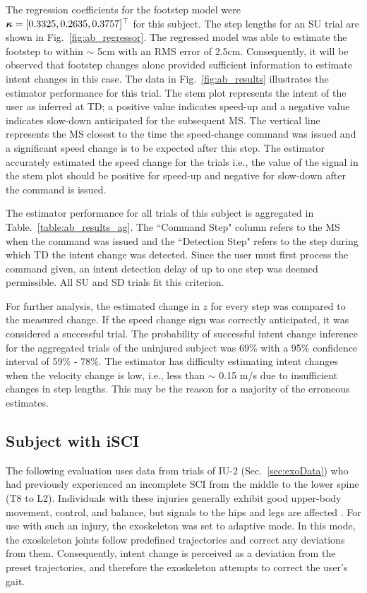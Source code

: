 The regression coefficients for the footstep model were $ \boldsymbol{\kappa} = [0.3325 ,0.2635 ,0.3757]^{\top} $ for this subject. The step lengths for an SU trial are shown in Fig.~\ref{fig:ab_regressor}. The regressed model was able to estimate the footstep to within $ \sim $ 5cm with an RMS error of 2.5cm. Consequently, it will be observed that footstep changes alone provided sufficient information to estimate intent changes in this case. The data in Fig.~\ref{fig:ab_results} illustrates the estimator performance for this trial. The stem plot represents the intent of the user as inferred at TD; a positive value indicates speed-up and a negative value indicates slow-down anticipated for the subsequent MS. The vertical line represents the MS closest to the time the speed-change command was issued and a significant speed change is to be expected after this step. The estimator accurately estimated the speed change for the trials i.e., the value of the signal in the stem plot should be positive for speed-up and negative for slow-down after the command is issued.

The estimator performance for all trials of this subject is aggregated in Table.~\ref{table:ab_results_ag}. The ``Command Step" column refers to the MS when the command was issued and the ``Detection Step" refers to the step during which TD the intent change was detected. Since the user must first process the command given, an intent detection delay of up to one step was deemed permissible. All SU and SD trials fit this criterion. 
		
For further analysis, the estimated change in $ z $ for every step was compared to the measured change. If the speed change sign was correctly anticipated, it was considered a successful trial. The probability of successful intent change inference for the aggregated trials of the uninjured subject was 69\% with a 95\% confidence interval \cite{brown2001interval} of 59\% - 78\%. The estimator has difficulty estimating intent changes when the velocity change is low, i.e., less than $ \sim $ 0.15 m/s due to insufficient changes in step lengths. This may be the reason for a majority of the erroneous estimates.
%
%
%

\subsection{Subject with iSCI}

The following evaluation uses data from trials of IU-2 (Sec.~\ref{sec:exoData}) who had previously experienced an incomplete SCI from the middle to the lower spine (T8 to L2). Individuals with these injuries generally exhibit good upper-body movement, control, and balance, but signals to the hips and legs are affected \cite{reevespinal}. %
For use with such an injury, the exoskeleton was set to adaptive mode. In this mode, the exoskeleton joints follow predefined trajectories and correct any deviations from them. Consequently, intent change is perceived as a deviation from the preset trajectories, and therefore the exoskeleton attempts to correct the user's gait. 

